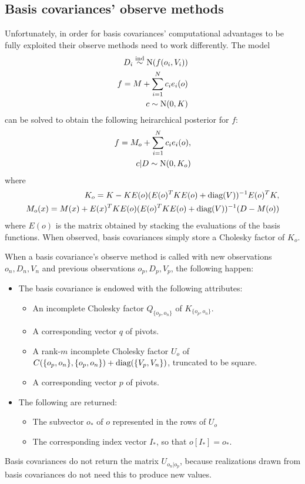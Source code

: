 \documentclass{report}
\begin{document}
\subsection{Basis covariances' observe methods}
Unfortunately, in order for basis covariances' computational advantages to be fully exploited their observe methods need to work differently. The model
\begin{eqnarray*}
    D_i \stackrel{\tiny{\textup{ind}}}{\sim} \textup{N}(f(o_i, V_i))\\
    f = M + \sum_{i=1}^N c_i e_i(o)\\
    c \sim \textup{N}(0, K) 
\end{eqnarray*}
can be solved to obtain the following heirarchical posterior for $f$:
\begin{eqnarray*}
    f = M_o + \sum_{i=1}^N c_i e_i(o),\\
    c|D \sim \textup{N}(0, K_o) 
\end{eqnarray*}
where
\begin{eqnarray*}
    K_o = K - KE(o)(E(o)^TKE(o) + \textup{diag}(V))^{-1}E(o)^TK,\\
    M_o(x) = M(x) + E(x)^TKE(o)(E(o)^TKE(o) + \textup{diag}(V))^{-1}(D-M(o))
\end{eqnarray*}
where $E(o)$ is the matrix obtained by stacking the evaluations of the basis functions. When observed, basis covariances simply store a Cholesky factor of $K_o$.

\bigskip
When a basis covariance's observe method is called with new observations $o_n, D_n, V_n$ and previous observations $o_p, D_p, V_p$, the following happen:
\begin{itemize}
    \item The basis covariance is endowed with the following attributes:
    \begin{itemize}
        \item An incomplete Cholesky factor  $Q_{\{o_p,o_n\}}$ of $K_{\{o_p,o_n\}}$.
        \item A corresponding vector $q$ of pivots.
        \item A rank-$m$ incomplete Cholesky factor $U_o$ of $C(\{o_p, o_n\}, \{o_p, o_n\}) + \textup{diag}(\{V_p, V_n\})$, truncated to be square.
        \item A corresponding vector $p$ of pivots.
    \end{itemize}
    \item The following are returned:
    \begin{itemize}
        \item The subvector $o_*$ of $o$ represented in the rows of $U_o$
        \item The corresponding index vector $I_*$, so that $o[{I_*}] = o_*$.
    \end{itemize}
\end{itemize}
Basis covariances do not return the matrix $U_{o_n|o_p}$, because realizations drawn from basis covariances do not need this to produce new values.
\end{document}
